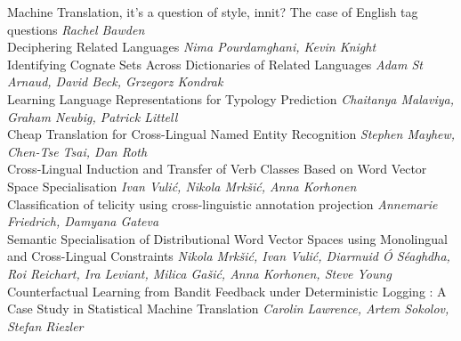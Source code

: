 \documentclass{book}
\begin{document}
    \noindent	Machine Translation, it's a question of style, innit? The case of English tag questions \newline 
    {\itshape Rachel Bawden} \\
    
    \noindent	Deciphering Related Languages \newline 
    {\itshape Nima Pourdamghani, Kevin Knight} \\
    
    \noindent	Identifying Cognate Sets Across Dictionaries of Related Languages \newline 
    {\itshape Adam St Arnaud, David Beck, Grzegorz Kondrak} \\
    
    \noindent	Learning Language Representations for Typology Prediction \newline 
    {\itshape Chaitanya Malaviya, Graham Neubig, Patrick Littell} \\
    
    \noindent	Cheap Translation for Cross-Lingual Named Entity Recognition \newline 
    {\itshape Stephen Mayhew, Chen-Tse Tsai, Dan Roth} \\
    
    \noindent	Cross-Lingual Induction and Transfer of Verb Classes Based on Word Vector Space Specialisation \newline 
    {\itshape Ivan Vulić, Nikola Mrkšić, Anna Korhonen} \\
    
    \noindent	Classification of telicity using cross-linguistic annotation projection \newline 
    {\itshape Annemarie Friedrich, Damyana Gateva} \\
    
    \noindent	Semantic Specialisation of Distributional Word Vector Spaces using Monolingual and Cross-Lingual Constraints \newline 
    {\itshape Nikola Mrkšić, Ivan Vulić, Diarmuid Ó Séaghdha, Roi Reichart, Ira Leviant, Milica Gašić, Anna Korhonen, Steve Young} \\
    
    \noindent	Counterfactual Learning from Bandit Feedback under Deterministic Logging : A Case Study in Statistical Machine Translation \newline 
    {\itshape Carolin Lawrence, Artem Sokolov, Stefan Riezler} \\
    
\vspace*{\fill}
\end{document}
